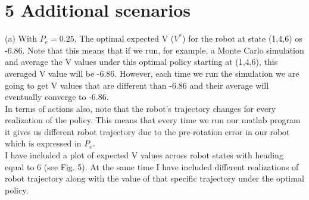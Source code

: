 \documentclass{article}
\begin{document}
	\section*{5  Additional scenarios}
	(a)
	 	With $P_{e} = 0.25$, The optimal expected V ($V^*$) for the robot at state (1,4,6) os -6.86. Note that this means that if we run, for example, a Monte Carlo simulation and average the V values under this optimal policy starting at (1,4,6), this averaged V value will be -6.86. However, each time we run the simulation we are going to get V values that are different than -6.86 and their average will eventually converge to -6.86. \\
		In terms of actions also, note that the robot's trajectory changes for every realization of the policy. This means that every time we run our matlab program it gives us different robot trajectory due to the pre-rotation error in our robot which is expressed in $P_{e}$. \\
		I have included a plot of expected V values across robot states with heading equal to 6 (see Fig. 5). At the same time I have included different realizations of robot trajectory along with the value of that specific trajectory under the optimal policy.
\vspace{50pt}  
\end{document}
